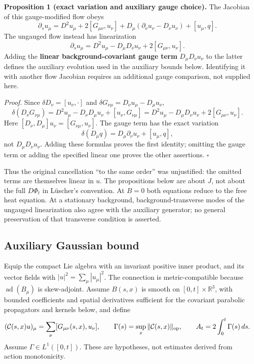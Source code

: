 \documentclass[11pt,a4paper]{article}
\begin{document}
\textbf{Proposition 1 (exact variation and auxiliary gauge choice).} The
Jacobian of this gauge-modified flow obeys
\[\partial_su_\mu=D^2u_\mu+2[G_{\mu\nu},u_\nu]
+D_\mu(\partial_\nu u_\nu-D_\nu u_\nu)+[u_\mu,q].\] The ungauged flow
instead has linearization \[\partial_su_\mu=D^2u_\mu-D_\mu D_\nu u_\nu
+2[G_{\mu\nu},u_\nu].\] Adding the \textbf{linear background-covariant
gauge term} \(D_\mu D_\nu u_\nu\) to the latter defines the auxiliary
evolution used in the auxiliary bounds below. Identifying it with
another flow Jacobian requires an additional gauge comparison, not
supplied here.

\emph{Proof.} Since \(\delta D_\nu=[u_\nu,\cdot]\) and
\(\delta G_{\nu\mu}=D_\nu u_\mu-D_\mu u_\nu\),
\[\delta(D_\nu G_{\nu\mu})
=D^2u_\mu-D_\nu D_\mu u_\nu+[u_\nu,G_{\nu\mu}]
=D^2u_\mu-D_\mu D_\nu u_\nu+2[G_{\mu\nu},u_\nu].\] Here
\([D_\nu,D_\mu]u_\nu=[G_{\nu\mu},u_\nu]\). The gauge term has the exact
variation \[\delta(D_\mu q)=D_\mu\partial_\nu u_\nu+[u_\mu,q],\] not
\(D_\mu D_\nu u_\nu\). Adding these formulas proves the first identity;
omitting the gauge term or adding the specified linear one proves the
other assertions. \(\square\)

Thus the original cancellation ``to the same order'' was unjustified:
the omitted terms are themselves linear in \(u\). The propositions below
are about \(J\), not about the full \(D\Phi_t\) in Lüscher's convention.
At \(B=0\) both equations reduce to the free heat equation. At a
stationary background, background-transverse modes of the ungauged
linearization also agree with the auxiliary generator; no general
preservation of that transverse condition is asserted.

\hypertarget{auxiliary-gaussian-bound}{%
\subsection{Auxiliary Gaussian bound}\label{auxiliary-gaussian-bound}}

Equip the compact Lie algebra with an invariant positive inner product,
and its vector fields with \(|u|^2=\sum_\mu|u_\mu|^2\). The connection
is metric-compatible because \(\operatorname{ad}(B_\mu)\) is
skew-adjoint. Assume \(B(s,x)\) is smooth on \([0,t]\times\mathbb R^3\),
with bounded coefficients and spatial derivatives sufficient for the
covariant parabolic propagators and kernels below, and define
\[(\mathcal C(s,x)u)_\mu=\sum_\nu[G_{\mu\nu}(s,x),u_\nu],\qquad
 \Gamma(s)=\sup_x\|\mathcal C(s,x)\|_{\rm op},\qquad
 A_t=2\int_0^t\Gamma(s)\,ds.\] Assume \(\Gamma\in L^1([0,t])\). These
are hypotheses, not estimates derived from action monotonicity.
\end{document}

